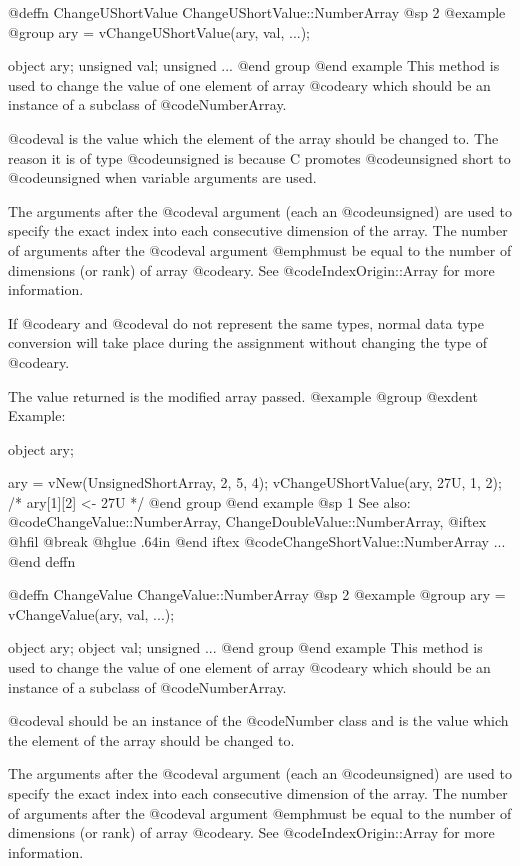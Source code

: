 @deffn {ChangeUShortValue} ChangeUShortValue::NumberArray
@sp 2
@example
@group
ary = vChangeUShortValue(ary, val, ...);

object    ary;
unsigned  val;
unsigned  ...
@end group
@end example
This method is used to change the value of one element of
array @code{ary} which should be an instance of a subclass of
@code{NumberArray}.

@code{val} is the value which the element of the array should be changed
to.  The reason it is of type @code{unsigned} is because C promotes
@code{unsigned short} to @code{unsigned} when variable arguments are used.

The arguments after the @code{val} argument (each an @code{unsigned})
are used to specify the exact index into each consecutive dimension of
the array.  The number of arguments after the @code{val} argument
@emph{must} be equal to the number of dimensions (or rank) of array
@code{ary}.  See @code{IndexOrigin::Array} for more information.

If @code{ary} and @code{val} do not represent the same types, normal
data type conversion will take place during the assignment without
changing the type of @code{ary}.

The value returned is the modified array passed.
@example
@group
@exdent Example:

object  ary;

ary = vNew(UnsignedShortArray, 2, 5, 4);
vChangeUShortValue(ary, 27U, 1, 2);
/*  ary[1][2] <- 27U  */
@end group
@end example
@sp 1
See also:  @code{ChangeValue::NumberArray, ChangeDoubleValue::NumberArray,}
@iftex
@hfil @break @hglue .64in 
@end iftex
@code{ChangeShortValue::NumberArray}  ...
@end deffn








@deffn {ChangeValue} ChangeValue::NumberArray
@sp 2
@example
@group
ary = vChangeValue(ary, val, ...);

object    ary;
object    val;
unsigned  ...
@end group
@end example
This method is used to change the value of one element of array @code{ary}
which should be an instance of a subclass of @code{NumberArray}.

@code{val} should be an instance of the @code{Number} class and is the
value which the element of the array should be changed to.

The arguments after the @code{val} argument (each an @code{unsigned})
are used to specify the exact index into each consecutive dimension of
the array.  The number of arguments after the @code{val} argument
@emph{must} be equal to the number of dimensions (or rank) of array
@code{ary}.  See @code{IndexOrigin::Array} for more information.

